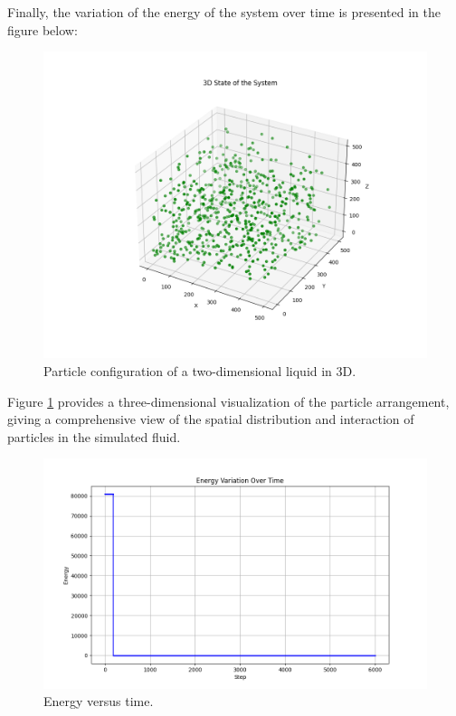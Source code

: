 \documentclass[a4paper,12pt]{article}
\begin{document}
 Finally, the variation of the energy of the system over time is presented in the figure below:
\begin{figure}[H]
    \centering
    \includegraphics[width=13cm]{images/04.png}
    \caption{Particle configuration of a two-dimensional liquid in 3D.}
    \label{fig:3d}
\end{figure}

Figure \ref{fig:3d} provides a three-dimensional visualization of the particle arrangement, giving a comprehensive view of the spatial distribution and interaction of particles in the simulated fluid.

\begin{figure}[H]
    \centering
    \includegraphics[width=13cm]{images/05.png}
    \caption{Energy versus time.}
    \label{fig:energy}
\end{figure}
\end{document}
